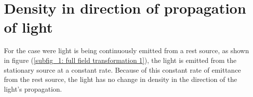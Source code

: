 







\section{Density in direction of propagation of light}\label{sect: Density in direction of propagation of light}


For the case were light is being continuously emitted from a rest source, as shown in figure (\ref{subfig_1: full field transformation 1}), the light is emitted from the stationary source at a constant rate.
Because of this constant rate of emittance from the rest source, the light has no change in density in the direction of the light's propagation.

